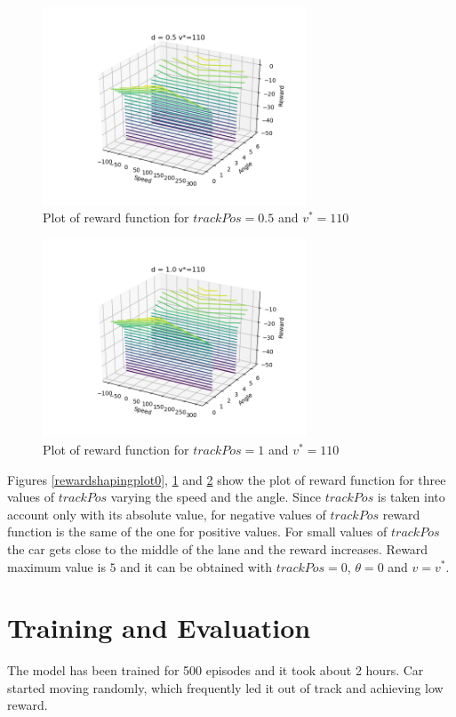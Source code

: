 \documentclass[Lau,oneside,noexaminfo]{sapthesis} %
\begin{document}
\begin{figure}[H]
  \centering
  \includegraphics[width=0.7\textwidth]{reward_plot05}
  \caption{Plot of reward function for $trackPos = 0.5$ and $v^*=110$}
  \label{rewardshapingplot05}
\end{figure}
\begin{figure}[H]
  \centering
  \includegraphics[width=0.7\textwidth]{reward_plot1}
  \caption{Plot of reward function for $trackPos = 1$ and $v^*=110$}
  \label{rewardshapingplot1}
\end{figure}
Figures \ref{rewardshapingplot0}, \ref{rewardshapingplot05} and \ref{rewardshapingplot1} show the plot of reward function for three values of $trackPos$ varying the speed and the angle. Since $trackPos$ is taken into account only with its absolute value, for negative values of $trackPos$ reward function is the same of the one for positive values. For small values of $trackPos$ the car gets close to the middle of the lane and the reward increases. Reward maximum value is $5$ and it can be obtained with $trackPos=0$, $\theta=0$ and $v=v^*$.



\chapter{Training and Evaluation}
The model has been trained for 500 episodes and it took about 2 hours. Car started moving randomly, which frequently led it out of track and achieving low reward. 
\end{document}
